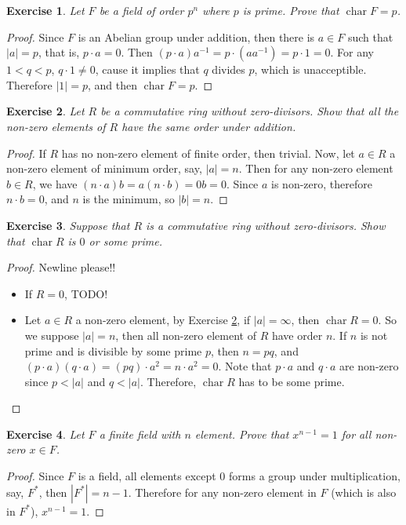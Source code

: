\documentclass[14pt]{extarticle}
\newtheorem{exercise}{Exercise}[section]
\newcommand{\inv}[1]{#1^{-1}}
\newcommand{\1}{\{e\}}
\DeclareMathOperator{\chara}{char}
\begin{document}
\begin{exercise}
  Let $F$ be a field of order $p^n$ where $p$ is prime. Prove that $\chara F = p$.
\end{exercise}
\begin{proof}
  Since $F$ is an Abelian group under addition, then there is $a \in F$ such that
  $|a| = p$, that is, $p \cdot a = 0$. 
  Then $(p \cdot a) \inv{a} = p \cdot (a \inv{a}) = p \cdot 1 = 0$.
  For any $1 < q < p$, $q \cdot 1 \neq 0$, cause it implies that $q$ divides $p$,
  which is unacceptible. Therefore $|1| = p$, and then $\chara F = p$.
\end{proof}

\setcounter{exercise}{46}
\begin{exercise}
  \label{exercise:13.47}
  Let $R$ be a commutative ring without zero-divisors.
  Show that all the non-zero elements of $R$ have the same order under addition.
\end{exercise}
\begin{proof}
  If $R$ has no non-zero element of finite order, then trivial.
  Now, let $a \in R$ a non-zero element of minimum order, say, $|a| = n$.
  Then for any non-zero element $b \in R$,
  we have $(n \cdot a) b = a (n \cdot b) = 0b = 0$.
  Since $a$ is non-zero, therefore $n \cdot b = 0$,
  and $n$ is the minimum, so $|b| = n$.
\end{proof}

\begin{exercise}
  Suppose that $R$ is a commutative ring without zero-divisors.
  Show that $\chara R$ is $0$ or some prime.
\end{exercise}
\begin{proof}
  Newline please!!
  \begin{itemize}
    \item If $R = 0$, TODO!
    \item Let $a \in R$ a non-zero element, by Exercise \ref{exercise:13.47},
          if $|a| = \infty$, then $\chara R = 0$. So we suppose $|a| = n$,
          then all non-zero element of $R$ have order $n$. If $n$ is not prime
          and is divisible
          by some prime $p$, then $n = pq$, 
          and $(p \cdot a) (q \cdot a) = (pq) \cdot a^2 = n \cdot a^2 = 0$.
          Note that $p \cdot a$ and $q \cdot a$ are non-zero
          since $p < |a|$ and $q < |a|$.
          Therefore, $\chara R$ has to be some prime.
  \end{itemize}
\end{proof}

\setcounter{exercise}{63}
\begin{exercise}
  Let $F$ a finite field with $n$ element. Prove that $x^{n - 1} = 1$
  for all non-zero $x \in F$.
\end{exercise}
\begin{proof}
  Since $F$ is a field, all elements except $0$ forms a group under multiplication, 
  say, $F^*$, then $|F^*| = n - 1$.
  Therefore for any non-zero element in $F$ (which is also in $F^*$), $x^{n - 1} = 1$.
\end{proof}
\end{document}
